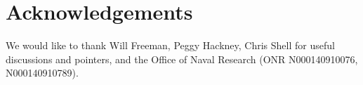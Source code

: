 \documentclass[times, 10pt,twocolumn]{article}
\begin{document}
\section{Acknowledgements}
We would like to thank Will Freeman, Peggy Hackney, Chris Shell for useful discussions and pointers, and the Office of Naval Research (ONR N000140910076, N000140910789).


{\tiny


}
\end{document}
